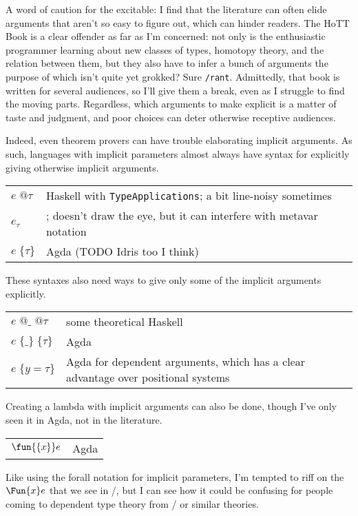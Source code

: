 \documentclass[11pt]{article} %
\theoremstyle{definition}
\theoremstyle{remark}
\begin{document}
A word of caution for the excitable: I find that the literature can often elide arguments that aren't so easy to figure out, which can hinder readers.
The HoTT Book\cite{hottbook} is a clear offender as far as I'm concerned: not only is the enthusiastic programmer learning about new classes of types, homotopy theory, and the relation between them, but they also have to infer a bunch of arguments the purpose of which isn't quite yet grokked?
Sure \verb!/rant!.
Admittedly, that book is written for several audiences, so I'll give them a break, even as I struggle to find the moving parts.
Regardless, which arguments to make explicit is a matter of taste and judgment, and poor choices can deter otherwise receptive audiences.

Indeed, even theorem provers can have trouble elaborating implicit arguments.
As such, languages with implicit parameters almost always have syntax for explicitly giving otherwise implicit arguments.
\begin{center}
\renewcommand{\arraystretch}{1.2}
\begin{tabular}{lp{8.2cm}}
$e\;@\tau$ & Haskell with \texttt{TypeApplications}; a bit line-noisy sometimes \\
$e_\tau$ & \cite{hottbook}; doesn't draw the eye, but it can interfere with metavar notation \\
$e\;\{\tau\}$ & Agda (TODO Idris too I think) \\
\end{tabular}
\end{center}
These syntaxes also need ways to give only some of the implicit arguments explicitly.
\begin{center}
\renewcommand{\arraystretch}{1.2}
\begin{tabular}{lp{8.2cm}}
$e\;@\_\;@\tau$ & some theoretical Haskell \\
$e\;\{\_\}\;\{\tau\}$ & Agda \\
$e\;\{y = \tau\}$ & Agda for dependent arguments, which has a clear advantage over positional systems \\
\end{tabular}
\end{center}

Creating a lambda with implicit arguments can also be done, though I've only seen it in Agda, not in the literature.
\begin{center}
\renewcommand{\arraystretch}{1.2}
\begin{tabular}{lp{8.2cm}}
$\fun{\{x\}}e$ & Agda \\
\end{tabular}
\end{center}
Like using the forall notation for implicit parameters, I'm tempted to riff on the $\Fun{x}e$ that we see in \SystemF/, but I can see how it could be confusing for people coming to dependent type theory from \SystemF/ or similar theories.
\end{document}
